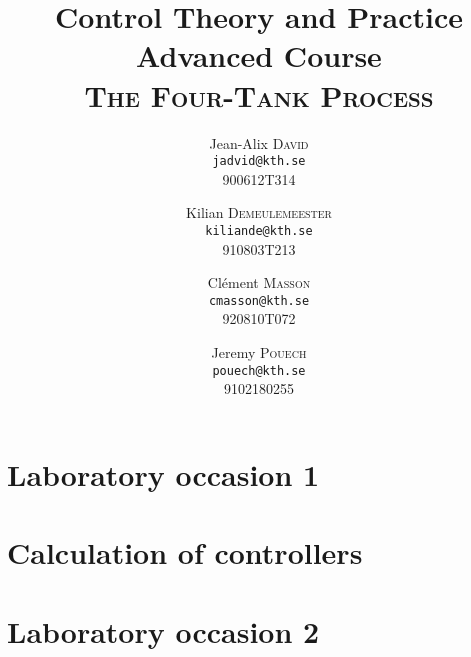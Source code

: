 \documentclass[a4paper,8pt,twocolumn]{extarticle}
\title{Control Theory and Practice \\ Advanced Course \\ \textsc{The Four-Tank Process}}
\author{Jean-Alix \textsc{David} \\ \texttt{jadvid@kth.se} \\ 900612T314 
    \and
        Kilian \textsc{Demeulemeester} \\ \texttt{kiliande@kth.se} \\ 910803T213 
    \and 
        Clément \textsc{Masson} \\ \texttt{cmasson@kth.se} \\ 920810T072
    \and
Jeremy \textsc{Pouech} \\ \texttt{pouech@kth.se} \\ 9102180255
}
\begin{document}
\setlength\parindent{0em}

\maketitle




\section{Laboratory occasion 1}




 
\section{Calculation of controllers}

\setcounter{subsection}{1}

\setcounter{subsection}{-1}

\section{Laboratory occasion 2}







\nocite{*}


\end{document}
